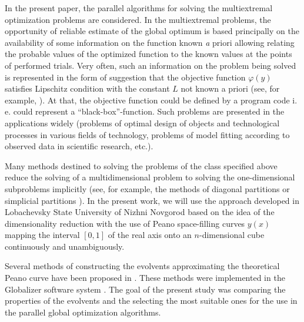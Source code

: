 \documentclass[runningheads]{llncs}
\begin{document}
In the present paper, the parallel algorithms for solving the multiextremal optimization problems
are considered. In the multiextremal problems, the opportunity of reliable estimate of the global
optimum is based principally on the availability of some information on the function known
{\textit a priori} allowing relating the probable values of the optimized function to the known
values at the points of performed trials. Very often, such an information on the problem being
solved is represented in the form of suggestion that the objective function $\varphi(y)$ satisfies
Lipschitz condition with the constant $L$ not known a priori (see, for example,
\cite{Jones,Gablonsky,Evtushenko}). At that, the objective function could be defined by a
program code i. e. could represent a ``black-box''-function. Such problems are presented in the
applications widely (problems of optimal design of objects and technological processes in
various fields of technology, problems of model fitting according to observed data in scientific
research, etc.).

Many methods destined to solving the problems of the class specified above reduce the solving
of a multidimensional problem to solving the one-dimensional subproblems implicitly (see, for
example, the methods of diagonal partitions \cite{SergeyevKvasov2015} or
simplicial partitions \cite{Zilinskas2014}). In the present work, we will use the
approach developed in Lobachevsky State University of Nizhni Novgorod based on the idea of
the dimensionality reduction with the use of Peano space-filling curves $y(x)$ mapping the
interval $[0,1]$ of the real axis onto an $n$-dimensional cube continuously and unambiguously.

Several methods of constructing the evolvents approximating the theoretical Peano curve have
been proposed in \cite{strongin1978,Strongin1992,Goryachih2017,Gergel2009}. These
methods were implemented in the Globalizer software system \cite{globalizerSystem}. The goal
of the present study was comparing the properties of the evolvents and the selecting the most
suitable ones for the use in the parallel global optimization algorithms.

\end{document}
